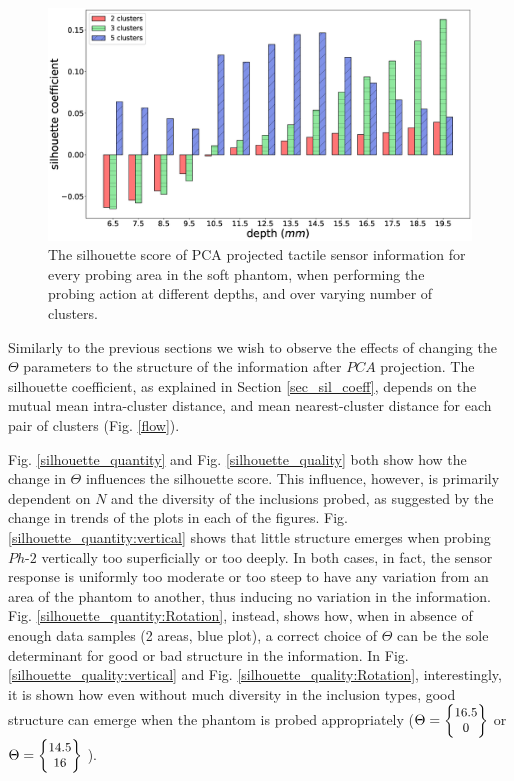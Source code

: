 \begin{figure}[]
	\centering
	\includegraphics[width=\columnwidth]{./figs/bar_clst_num_change.eps}
	\caption{The silhouette score of PCA projected tactile sensor information for every probing area in the 
		soft phantom, when performing the probing action at different depths, and over varying number of 
		clusters.}
	\label{clst_number}
\end{figure}

Similarly to the previous sections we wish to observe the effects of changing the $\Theta$ parameters
to the structure of the information after $PCA$ projection. The silhouette coefficient, as explained in Section \ref{sec_sil_coeff}, depends on the mutual mean intra-cluster distance, and mean nearest-cluster distance for each pair of clusters (Fig. \ref{flow}).

Fig. \ref{silhouette_quantity} and Fig. \ref{silhouette_quality} both show how the change in $\Theta$ 
influences the silhouette score. This influence, however, is primarily dependent 
on $N$ and the diversity of the inclusions probed, as suggested by the change in 
trends of the plots in each of the figures. Fig. \ref{silhouette_quantity:vertical} shows 
that little structure emerges when probing $Ph\text{-}2$ vertically too superficially or too deeply. 
In both cases, in fact, the sensor response is uniformly too moderate or too steep to have any variation 
from an area of the phantom to another, thus inducing no variation in the information. Fig. 
\ref{silhouette_quantity:Rotation}, instead, shows how, when in absence of enough data samples (2 areas, blue plot), 
a correct choice of $\Theta$ can be the sole determinant for good or bad structure in the information. 
In Fig. \ref{silhouette_quality:vertical} and Fig. \ref{silhouette_quality:Rotation}, interestingly, it is shown 
how even without much diversity in the inclusion types, good structure can emerge when the phantom is probed appropriately
($\Theta = \small{\begin{Bmatrix}16.5\\ 0\end{Bmatrix}}$ or $\Theta = \small{\begin{Bmatrix}14.5\\ 16\end{Bmatrix}}$ ).


